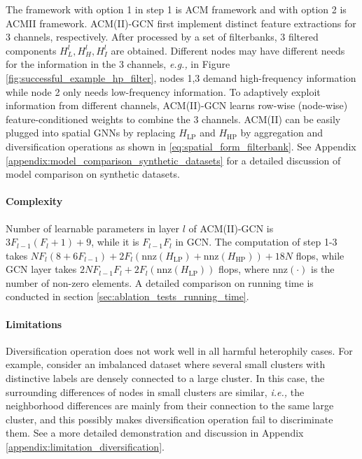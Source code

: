 \documentclass{article}
\newcommand\ie{\textit{i.e.,}}
\newcommand\eg{\textit{e.g.,}}
\newcommand{\0}{{\boldsymbol{0}}}
\newcommand{\6}{{\partial}}
\newcommand{\8}{{\infty}}
\newcommand{\4}{{\nabla}}
\begin{document}
The framework with option 1 in step 1 is ACM framework and with option 2 is ACMII framework. ACM(II)-GCN first implement distinct feature extractions for $3$ channels, respectively. After processed by a set of filterbanks, $3$ filtered components $H_L^l,H_H^l, H_I^l$ are obtained. Different nodes may have different needs for the information in the 3 channels, \eg{} in Figure \ref{fig:successful_example_hp_filter}, nodes 1,3 demand high-frequency information while node 2 only needs low-frequency information. To adaptively exploit information from different channels, ACM(II)-GCN learns row-wise (node-wise) feature-conditioned weights to combine the $3$ channels. ACM(II) can be easily plugged into spatial GNNs by replacing $H_\text{LP}$ and $H_\text{HP}$ by aggregation and diversification operations as shown in \eqref{eq:spatial_form_filterbank}.  See Appendix \ref{appendix:model_comparison_synthetic_datasets} for a detailed discussion of model comparison on synthetic datasets.
\vspace*{-2.5mm}
\paragraph{Complexity} Number of learnable parameters in layer $l$ of ACM(II)-GCN is $3F_{l-1}(F_l +1)+9$, while it is $F_{l-1}F_l$ in GCN. The computation of step 1-3 takes $NF_l(8+6F_{l-1}) + 2F_l(\text{nnz}(H_\text{LP}) + \text{nnz}(H_\text{HP}))+ 18N$ flops, while GCN layer takes $2NF_{l-1}F_l + 2F_l(\text{nnz}(H_\text{LP}))$ flops, where $\text{nnz}(\cdot)$ is the number of non-zero elements. A detailed comparison on running time is conducted in section \ref{sec:ablation_tests_running_time}.
\vspace*{-2.5mm}
\paragraph{Limitations} Diversification operation does not work well in all harmful heterophily cases. For example, consider an imbalanced dataset where several small clusters with distinctive labels are densely connected to a large cluster. In this case, the surrounding differences of nodes in small clusters are similar, \ie{} the neighborhood differences are mainly from their connection to the same large cluster, and this possibly makes diversification operation fail to discriminate them. See a more detailed demonstration and discussion in Appendix \ref{appendix:limitation_diversification}.
\end{document}
